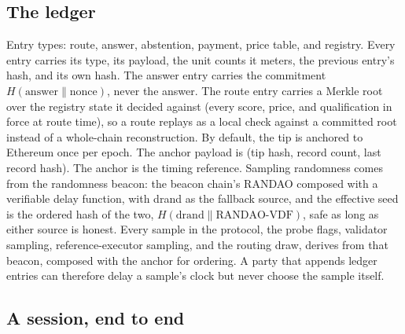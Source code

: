 \documentclass[11pt]{article}
\begin{document}
\subsection{The ledger}

Entry types: route, answer, abstention, payment, price table, and
registry. Every entry carries its type, its payload, the unit
counts it meters, the previous entry's hash, and its own hash.
The answer entry carries the commitment $H(\text{answer} \|
    \text{nonce})$, never the answer. The route entry carries a
Merkle root over the registry state it decided against (every
score, price, and qualification in force at route time), so a
route replays as a local check against a committed root instead
of a whole-chain reconstruction.
By default, the tip is anchored to Ethereum once per epoch. The
anchor payload is (tip hash, record count, last record hash).
The anchor is the timing reference. Sampling randomness comes
from the randomness beacon: the beacon chain's RANDAO composed
with a verifiable delay function, with drand as the fallback
source, and the effective seed is the ordered hash of the two,
$H(\text{drand} \parallel \text{RANDAO-VDF})$, safe as long as
either source is honest. Every sample in the
protocol, the probe flags, validator sampling, reference-executor
sampling, and the routing draw, derives from that beacon, composed
with the anchor for ordering. A party that appends ledger entries can therefore
delay a sample's clock but never choose the sample itself.

\subsection{A session, end to end}
\end{document}
